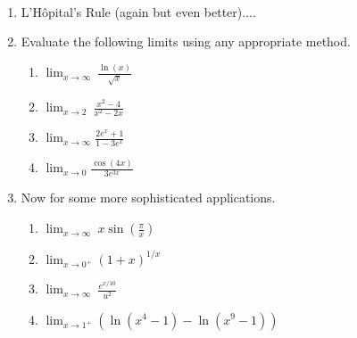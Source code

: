 \documentclass[11pt,fleqn]{article}
\begin{document}
\vspace*{-0.7in}

\begin{center}
  \Large{}\\
\end{center}

\begin{enumerate}
\item L'H\^{o}pital's Rule (again but even better)....

\vspace{2in}
\item Evaluate the following limits using any appropriate method.
\begin{enumerate}
	\item $\displaystyle{\lim_{x\to \infty}\: \frac{\ln(x)}{\sqrt{x}}}$\\
	\vfill
	\item $\displaystyle{\lim_{x\to 2}\: \frac{x^2-4}{x^2-2x}}$\\
	\vfill
	\item $\displaystyle{\lim_{x \to \infty} \frac{2e^x+1}{1-3e^x}}$
	\vfill
	\item $\displaystyle{\lim_{x \to 0} \frac{\cos(4x)}{3e^{3x}}}$
	\vfill
\end{enumerate}
\newpage
\item Now for some more sophisticated applications. 
	\begin{enumerate}
	\item $\displaystyle{\lim_{x\to \infty}\: x \sin(\frac{\pi}{x})}$\\
	\vfill
	\item $\displaystyle{\lim_{x\to 0^+} \left(1+x \right)^{1/x}}$\\
	\vfill
	\item $\displaystyle{\lim_{x\to \infty}\: \frac{e^{x/10}}{u^2}}$\\
	\vfill
	\item $\displaystyle{\lim_{x\to 1^+} \left(\ln(x^4-1)-\ln(x^9-1) \right)}$\\
	\vfill
	\end{enumerate}
\end{enumerate}
\end{document}
